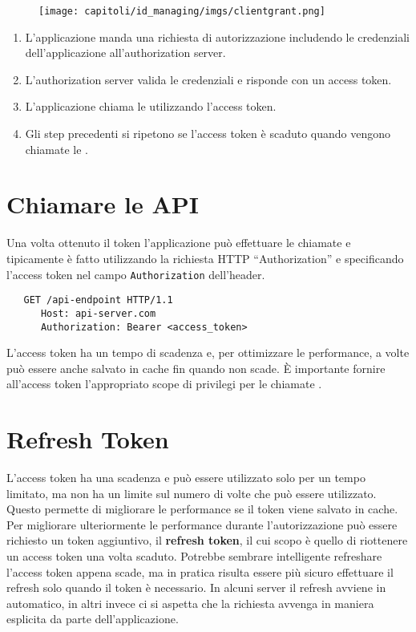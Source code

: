 \begin{figure}[H]
      \centering
      \texttt{[image: capitoli/id\_managing/imgs/clientgrant.png]}
\end{figure}

\begin{enumerate}
      \item L'applicazione manda una richiesta di autorizzazione includendo le credenziali
            dell'applicazione all'authorization server.
      \item L'authorization server valida le credenziali e risponde con un access token.
      \item L'applicazione chiama le \api{} utilizzando l'access token.
      \item Gli step precedenti si ripetono se l'access token è scaduto quando vengono chiamate
            le \api{}.
\end{enumerate}

\section{Chiamare le API}

Una volta ottenuto il token l'applicazione può effettuare le chiamate \api{} e tipicamente
è fatto utilizzando la richiesta HTTP ``Authorization'' e specificando l'access token
nel campo \verb|Authorization| dell'header.

\begin{lstlisting}
   GET /api-endpoint HTTP/1.1
      Host: api-server.com
      Authorization: Bearer <access_token>
\end{lstlisting}

L'access token ha un tempo di scadenza e, per ottimizzare le performance, a volte
può essere anche salvato in cache fin quando non scade. È importante fornire
all'access token  l'appropriato scope di privilegi per le chiamate \api{}.

\section{Refresh Token}

L'access token ha una scadenza e può essere utilizzato solo per un tempo limitato,
ma non ha un limite sul numero di volte che può essere utilizzato.
Questo permette di migliorare le performance se il token viene salvato in cache.
Per migliorare ulteriormente le performance durante l'autorizzazione può essere
richiesto un token aggiuntivo, il \textbf{refresh token}, il cui scopo è quello di
riottenere un access token una volta scaduto. Potrebbe sembrare intelligente
refreshare l'access token appena scade, ma in pratica risulta essere più sicuro
effettuare il refresh solo quando il token è necessario.
In alcuni server il refresh avviene in automatico, in altri invece ci si aspetta
che la richiesta avvenga in maniera esplicita da parte dell'applicazione.